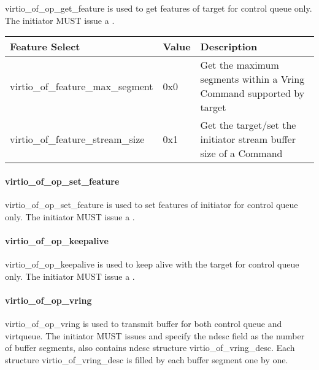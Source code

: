 virtio_of_op_get_feature is used to get features of target for control queue only.
The initiator MUST issue a .

\begin{tabular}{ |l|l|l| }
\hline
Feature Select & Value & Description \\
\hline
virtio_of_feature_max_segment & 0x0 & Get the maximum segments within a Vring Command supported by target \\
\hline
virtio_of_feature_stream_size & 0x1 & Get the target/set the initiator stream buffer size of a Command \\
\hline
\end{tabular}

\paragraph{virtio_of_op_set_feature}\label{sec:Virtio Transport Options / Virtio Over Fabrics / Transmission Protocol / Opcodes Definition / virtio_of_op_set_feature}

virtio_of_op_set_feature is used to set features of initiator for control queue only.
The initiator MUST issue a .

\paragraph{virtio_of_op_keepalive}\label{sec:Virtio Transport Options / Virtio Over Fabrics / Transmission Protocol / Opcodes Definition / virtio_of_op_keepalive}

virtio_of_op_keepalive is used to keep alive with the target for control queue only.
The initiator MUST issue a .

\paragraph{virtio_of_op_vring}\label{sec:Virtio Transport Options / Virtio Over Fabrics / Transmission Protocol / Opcodes Definition / virtio_of_op_vring}

virtio_of_op_vring is used to transmit buffer for both control queue and virtqueue.
The initiator MUST issues 
and specify the ndesc field as the number of buffer segments,
also contains ndesc structure virtio_of_vring_desc.
Each structure virtio_of_vring_desc is filled by each buffer segment one by one.

